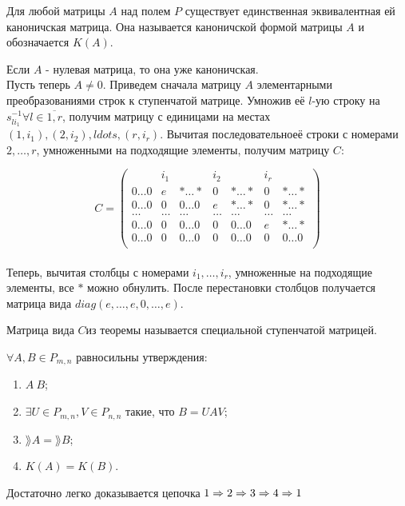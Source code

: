 \begin{proofs}
	Для любой матрицы $A$ над полем $P$ существует единственная эквивалентная ей каноничская матрица.
  Она называется каноничской формой матрицы $A$ и обозначается $K(A)$.
	\begin{dokvo}
    Если $A$ - нулевая матрица, то она уже каноничская.\\
    Пусть теперь $A \neq 0$. Приведем сначала матрицу $A$ элементарными преобразованиями строк к ступенчатой матрице.
    Умножив её $l$-ую строку на $s^{-1}_{li_1} \forall l \in \overline{1, r}$, получим матрицу
    с единицами на местах $(1, i_1), (2, i_2), ldots, (r, i_r)$. Вычитая последовательноеё строки с номерами $2, \ldots, r$, умноженными
    на подходящие элементы, получим матрицу $C$:


    $$C =
    \begin{pmatrix}
      & i_1 & & i_2 & & i_r & \\
      0\ldots0 & e & *\ldots* & 0 & *\ldots* & 0 & *\ldots* \\
      0\ldots0 & 0 & 0\ldots0 & e & *\ldots* & 0 & *\ldots* \\
      \ldots & \ldots & \ldots & \ldots & \ldots & \ldots & \ldots \\
      0\ldots0 & 0 & 0\ldots0 & 0 & 0\ldots0 & e & *\ldots* \\
      0\ldots0 & 0 & 0\ldots0 & 0 & 0\ldots0 & 0 & 0\ldots0 \\
    \end{pmatrix}$$\\

    Теперь, вычитая столбцы с номерами $i_1, \ldots, i_r$, умноженные на подходящие элементы,
    все $*$ можно обнулить. После перестановки столбцов получается матрица вида $diag(e, \ldots, e, 0, \ldots, e)$.
	\end{dokvo}
\end{proofs}

\begin{defs}
	Матрица вида $C$из теоремы называется специальной ступенчатой матрицей.
\end{defs}

\begin{proofs}
	$\forall A,B \in P_{m,n}$ равносильны утверждения:
  \begin{enumerate}
  	\item $A~B$;
  	\item $\exists U \in P_{m,n}, V \in P_{n,n}$ такие, что $B = UAV$;
    \item $\rang{A} = \rang{B}$;
    \item $K(A) = K(B)$.
  \end{enumerate}
	\begin{dokvo}
    Достаточно легко доказывается цепочка $1 \Rightarrow 2 \Rightarrow 3 \Rightarrow 4 \Rightarrow 1$
	\end{dokvo}
\end{proofs}
